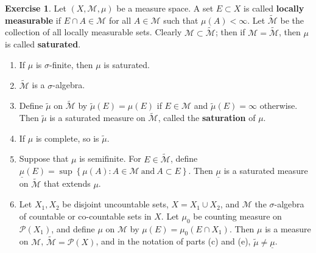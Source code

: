 \documentclass{article}
\theoremstyle{definition}
\newtheorem{ex}{Exercise}
\begin{document}
\begin{ex}
	Let $(X, \mathscr{M}, \mu)$ be a measure space.
	A set $E \subset X$ is called \textbf{locally measurable} if $E \cap A \in \mathscr{M}$ for all $A \in \mathscr{M}$ such that $\mu(A) < \infty$.
	Let $\widetilde{\mathscr{M}}$ be the collection of all locally measurable sets.
	Clearly $\mathscr{M} \subset \widetilde{\mathscr{M}}$; then if $\mathscr{M} = \widetilde{\mathscr{M}}$, then $\mu$ is called \textbf{saturated}.
	\begin{enumerate}[label=\textbf{\alph*.}]
		\item If $\mu$ is $\sigma$-finite, then $\mu$ is saturated.
		\item $\widetilde{\mathscr{M}}$ is a $\sigma$-algebra.
		\item Define $\widetilde{\mu}$ on $\widetilde{\mathscr{M}}$ by $\widetilde{\mu}(E) = \mu(E)$ if $E \in \mathscr{M}$ and $\widetilde{\mu}(E) = \infty$ otherwise.
		      Then $\widetilde{\mu}$ is a saturated measure on $\widetilde{\mathscr{M}}$, called the \textbf{saturation} of $\mu$.
		\item If $\mu$ is complete, so is $\widetilde{\mu}$.
		\item Suppose that $\mu$ is semifinite.
		      For $E \in \widetilde{\mathscr{M}}$, define $\underline{\mu}(E) = \sup \left\lbrace \mu(A) : A \in \mathscr{M}\ \mathrm{and}\ A \subset E \right\rbrace$.
		      Then $\underline{\mu}$ is a saturated measure on $\widetilde{\mathscr{M}}$ that extends $\mu$.
		\item Let $X_1, X_2$ be disjoint uncountable sets, $X = X_1 \cup X_2$, and $\mathscr{M}$ the $\sigma$-algebra of countable or co-countable sets in $X$.
		      Let $\mu_0$ be counting measure on $\mathscr{P}(X_1)$, and define $\mu$ on $\mathscr{M}$ by $\mu(E) = \mu_0(E \cap X_1)$.
		      Then $\mu$ is a measure on $\mathscr{M}$, $\widetilde{\mathscr{M}} = \mathscr{P}(X)$, and in the notation of parts (c) and (e), $\widetilde{\mu} \neq \underline{\mu}$.
	\end{enumerate}
\end{ex}
\end{document}

